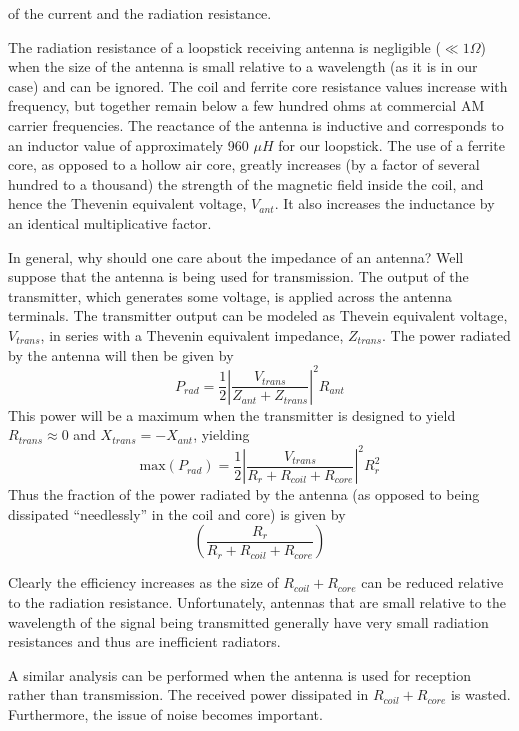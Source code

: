 \documentclass[12pt]{article}
\begin{document}
of the current and the radiation resistance.
\par The radiation resistance of a loopstick receiving antenna is negligible ($\ll 1\Omega$) when the size of the
antenna is small relative to a wavelength (as it is in our case) and can be ignored. The coil and ferrite core
resistance values increase with frequency, but together remain below a few hundred ohms at commercial
AM carrier frequencies. The reactance of the antenna is inductive and corresponds to an inductor value of
approximately 960 $\mu H$ for our loopstick. The use of a ferrite core, as opposed to a hollow air core, greatly
increases (by a factor of several hundred to a thousand) the strength of the magnetic field inside the coil, and
hence the Thevenin equivalent voltage, $V_{ant}$. It also increases the inductance by an identical multiplicative
factor.
\par In general, why should one care about the impedance of an antenna? Well suppose that the antenna is
being used for transmission. The output of the transmitter, which generates some voltage, is applied across
the antenna terminals. The transmitter output can be modeled as Thevein equivalent voltage, $V_{trans}$, in series with a Thevenin equivalent impedance, $Z_{trans}$. The power radiated by the antenna will then be given by
\begin{equation}
P_{rad}=\frac{1}{2}|\frac{V_{trans}}{Z_{ant}+Z_{trans}}|^2R_{ant}
\end{equation}
This power will be a maximum when the transmitter is designed to yield $R_{trans}\approx0$ and $X_{trans}=-X_{ant}$,
yielding
\begin{equation}
\text{max}(P_{rad})=\frac{1}{2}|\frac{V_{trans}}{R_r+R_{coil}+R_{core}}|^2R_{r}^2
\end{equation}
Thus the fraction of the power radiated by the antenna (as opposed to being dissipated “needlessly” in the
coil and core) is given by
$$(\frac{R_r}{R_r+R_{coil}+R_{core}})$$
\par Clearly the efficiency increases as the size of $R_{coil}+R_{core}$ can be reduced relative to the radiation resistance.
Unfortunately, antennas that are small relative to the wavelength of the signal being transmitted generally
have very small radiation resistances and thus are inefficient radiators.
\par A similar analysis can be performed when the antenna is used for reception rather than transmission.
The received power dissipated in $R_{coil}+R_{core}$ is wasted. Furthermore, the issue of noise becomes important.
\end{document}
